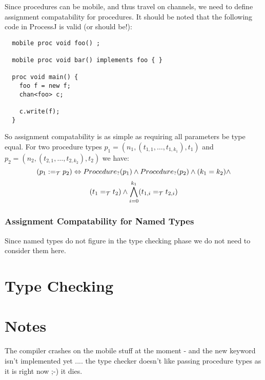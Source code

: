 \documentclass[pdflatex,11pt,letter]{article}
\newcommand{\te}{=_{\cal T}}
\newcommand{\ac}{:=_{\cal T}}
\begin{document}
Since procedures can be mobile, and thus travel on channels, we need to define assignment compatability for procedures. It should be noted that the following code in ProcessJ is valid (or should be!):
\begin{verbatim}
  mobile proc void foo() ;

  mobile proc void bar() implements foo { }

  proc void main() {
    foo f = new f;
    chan<foo> c;

    c.write(f);
  }
\end{verbatim}
So assignment compatability is as simple as requiring all parameters be type equal. For two procedure types $p_1 = (n_1,(t_{1,1},\ldots,t_{1,k_1}), t_1)$ and $p_2 = (n_2,(t_{2,1},\ldots,t_{2,k_2}), t_2)$ we have:
\[
(p_1 \ac p_2) \Leftrightarrow Procedure_?(p_1) \wedge Procedure_?(p_2) \wedge (k_1 = k_2) \wedge 
\]
\[
(t_1 \te t_2) \wedge \bigwedge_{i=0}^{k_1} (t_{1,i} \te t_{2,i})
\]

\subsubsection{Assignment Compatability for Named Types}
Since named types do not figure in the type checking phase we do not need to consider them here.

\section{Type Checking}







\section{Notes}

The compiler crashes on the mobile stuff at the moment - and the new keyword isn't implemented yet .... the type checker doesn't like passing procedure types as it is right now ;-) it dies.
\end{document}
